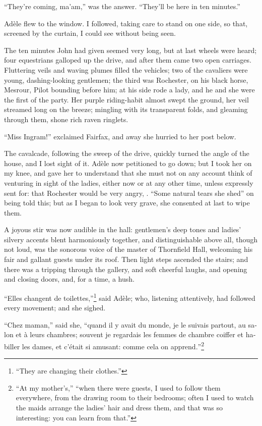 \enquote{They're coming, ma'am,} was the answer. \enquote{They'll be
	here in ten minutes.}

Adèle flew to the window. I followed, taking care to stand on one side,
so that, screened by the curtain, I could see without being seen.

The ten minutes John had given seemed very long, but at last wheels were
heard; four equestrians galloped up the drive, and after them came two
open carriages. Fluttering veils and waving plumes filled the vehicles;
two of the cavaliers were young, dashing-looking gentlemen; the third
was \Mr{} Rochester, on his black horse, Mesrour, Pilot bounding before
him; at his side rode a lady, and he and she were the first of the
party. Her purple riding-habit almost swept the ground, her veil
streamed long on the breeze; mingling with its transparent folds, and
gleaming through them, shone rich raven ringlets.

\enquote{Miss Ingram!} exclaimed \Mrs{} Fairfax, and away she hurried to
her post below.

The cavalcade, following the sweep of the drive, quickly turned the
angle of the house, and I lost sight of it. Adèle now petitioned to go
down; but I took her on my knee, and gave her to understand that she
must not on any account think of venturing in sight of the ladies,
either now or at any other time, unless expressly sent for: that \Mr{}
Rochester would be very angry, \etc. \enquote{Some natural tears she
	shed} on being told this; but as I began to look very grave, she
consented at last to wipe them.

A joyous stir was now audible in the hall: gentlemen's deep tones and
ladies' silvery accents blent harmoniously together, and distinguishable
above all, though not loud, was the sonorous voice of the master of
Thornfield Hall, welcoming his fair and gallant guests under its roof.
Then light steps ascended the stairs; and there was a tripping through
the gallery, and soft cheerful laughs, and opening and closing doors,
and, for a time, a hush.

\foreignquote{french}{Elles changent de toilettes,}\footnote{\enquote{They are changing their clothes.}}
said Adèle; who, listening attentively, had followed every movement; and she sighed.

\foreignquote{french}{Chez maman,} said she, \foreignquote{french}{quand il y avait du monde, je
	le suivais partout, au salon et à leurs chambres; souvent je regardais
	les femmes de chambre coiffer et habiller les dames, et c'était si
	amusant: comme cela on apprend.}\footnote{\enquote{At my mother's,} \textelp{}
	\enquote{when there were guests, I used to follow them everywhere, from the
		drawing room to their bedrooms; often I used to watch the maids arrange
		the ladies' hair and dress them, and that was so interesting: you can
		learn from that.}}


